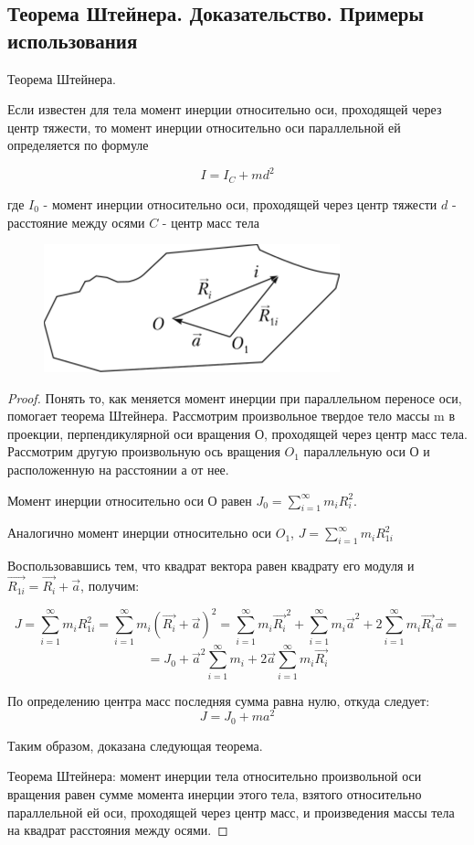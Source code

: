 \subsection{Теорема Штейнера. Доказательство. Примеры использования}

\begin{theorem}
    Теорема Штейнера.

    Если известен для тела момент инерции относительно оси, проходящей через центр тяжести, то момент инерции относительно оси параллельной ей определяется по формуле

    $$I=I_C+md^2$$

    где $I_0$ - момент инерции относительно оси, проходящей через центр тяжести
    $d$ - расстояние между осями
    $C$ - центр масс тела
\end{theorem}

\begin{figure}[h]
    \centering
    \includegraphics[width=0.5\linewidth]{imgs/q10i2.png}
\end{figure}

\begin{proof}
    Понять то, как меняется момент инерции при параллельном переносе оси, помогает теорема Штейнера. 
Рассмотрим произвольное твердое тело массы m в проекции, перпендикулярной оси вращения О, 
проходящей через центр масс тела. Рассмотрим другую произвольную ось вращения $O_1$ параллельную оси О 
и расположенную на расстоянии а от нее.

Момент инерции относительно оси О равен $J_0 = \sum\limits_{i=1}^\infty m_iR_i^2$.

Аналогично момент инерции относительно оси $O_1$, $J = \sum\limits_{i=1}^\infty m_iR_{1i}^2$

Воспользовавшись тем, что квадрат вектора равен квадрату его модуля и $\vec{R_{1i}}=\vec{R_i} + \vec{a}$, получим:

$$J 
= \sum\limits_{i=1}^\infty m_iR_{1i}^2 
= \sum\limits_{i=1}^\infty m_i(\vec{R_{i}} + \vec{a})^2
= \sum\limits_{i=1}^\infty m_i\vec{R_{i}}^2 + \sum\limits_{i=1}^\infty m_i\vec{a}^2 + 2\sum\limits_{i=1}^\infty m_i\vec{R_{i}}\vec{a} 
= 
$$
$$
= J_0 + \vec{a}^2\sum\limits_{i=1}^\infty m_i + 2\vec{a}\sum\limits_{i=1}^\infty m_i \vec{R_i}
$$

По определению центра масс последняя сумма равна нулю, откуда следует: 
$$J = J_0 + ma^2$$

Таким образом, доказана следующая теорема.

Теорема Штейнера: момент инерции тела относительно произвольной оси вращения равен сумме момента инерции этого тела, 
взятого относительно параллельной ей оси, проходящей через центр масс, и произведения массы тела на квадрат расстояния 
между осями.
\end{proof}


